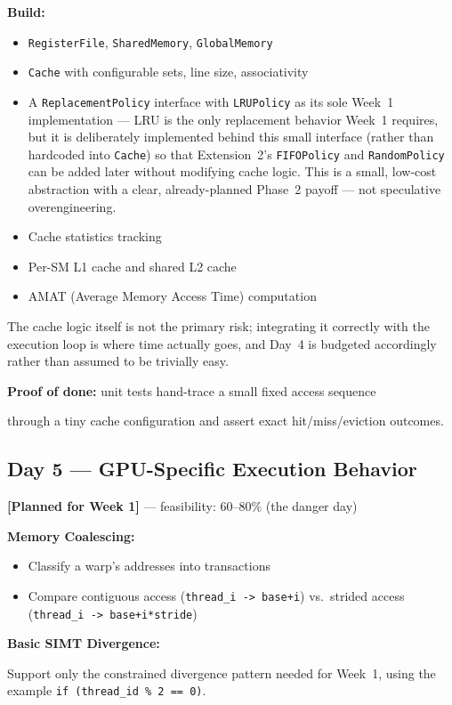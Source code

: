 \documentclass[11pt]{article}
\newcommand{\statuslabel}[1]{\textbf{\textcolor{steel}{[#1]}}}
\begin{document}
\textbf{Build:}
\begin{itemize}[leftmargin=1.2cm]
  \item \texttt{RegisterFile}, \texttt{SharedMemory}, \texttt{GlobalMemory}
  \item \texttt{Cache} with configurable sets, line size, associativity
  \item A \texttt{ReplacementPolicy} interface with \texttt{LRUPolicy} as
  its sole Week~1 implementation --- LRU is the only replacement behavior
  Week~1 requires, but it is deliberately implemented behind this small
  interface (rather than hardcoded into \texttt{Cache}) so that
  Extension~2's \texttt{FIFOPolicy} and \texttt{RandomPolicy} can be added
  later without modifying cache logic. This is a small, low-cost
  abstraction with a clear, already-planned Phase~2 payoff --- not
  speculative overengineering.
  \item Cache statistics tracking
  \item Per-SM L1 cache and shared L2 cache
  \item AMAT (Average Memory Access Time) computation
\end{itemize}

The cache logic itself is not the primary risk; integrating it correctly
with the execution loop is where time actually goes, and Day~4 is budgeted
accordingly rather than assumed to be trivially easy.

\textbf{Proof of done:} unit tests hand-trace a small fixed access sequence

through a tiny cache configuration and assert exact hit/miss/eviction
outcomes.

\subsection{Day 5 --- GPU-Specific Execution Behavior}
\statuslabel{Planned for Week 1} --- feasibility: 60--80\% (the danger day)

\textbf{Memory Coalescing:}
\begin{itemize}[leftmargin=1.2cm]
  \item Classify a warp's addresses into transactions
  \item Compare contiguous access (\texttt{thread\_i -> base+i}) vs.\
  strided access (\texttt{thread\_i -> base+i*stride})
\end{itemize}

\textbf{Basic SIMT Divergence:}
\begin{center}
\end{center}
Support only the constrained divergence pattern needed for Week~1, using
the example \texttt{if (thread\_id \% 2 == 0)}.
\end{document}
